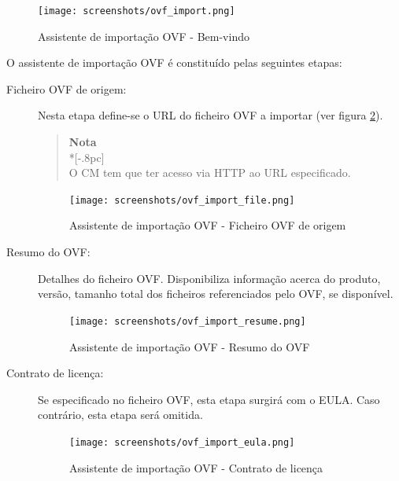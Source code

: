 \begin{figure}[H]
	\begin{center}
	\texttt{[image: screenshots/ovf\_import.png]}
	\caption{Assistente de importação OVF - Bem-vindo}
	\label{fig:ovf_import_wiz}
	\end{center}
\end{figure}

O assistente de importação OVF é constituído pelas seguintes etapas:

\begin{description}
	\item[Ficheiro OVF de origem:] Nesta etapa define-se o URL do ficheiro OVF a importar (ver figura \ref{fig:ovf_import_file}).
		
        \begin{quote}
            {\large \bf Nota} \\*[-.8pc]
            \underline{\hspace{6in}} \\
            O CM tem que ter acesso via HTTP ao URL especificado.
        \end{quote}

        \begin{figure}[H]
            \begin{center}
            \texttt{[image: screenshots/ovf\_import\_file.png]}
            \caption{Assistente de importação OVF - Ficheiro OVF de origem}
            \label{fig:ovf_import_file}
            \end{center}
        \end{figure}

	\item[Resumo do OVF:] Detalhes do ficheiro OVF. Disponibiliza informação acerca do produto, versão, tamanho total dos ficheiros referenciados pelo OVF, se disponível.
		\begin{figure}[H]
            \begin{center}
            \texttt{[image: screenshots/ovf\_import\_resume.png]}
            \caption{Assistente de importação OVF - Resumo do OVF}
            \label{fig:ovf_import_resume}
            \end{center}
        \end{figure}

    \item[Contrato de licença:] Se especificado no ficheiro OVF, esta etapa surgirá com o EULA. Caso contrário, esta etapa será omitida.
		\begin{figure}[H]
            \begin{center}
            \texttt{[image: screenshots/ovf\_import\_eula.png]}
            \caption{Assistente de importação OVF - Contrato de licença}
            \label{fig:ovf_import_eula}
            \end{center}
        \end{figure}


\end{description}
